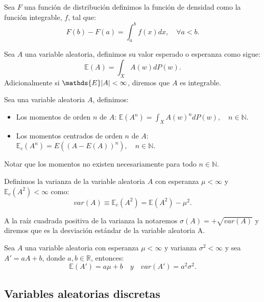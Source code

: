 \documentclass[../proyecto.tex]{memoir}
\begin{document}
\begin{defi}
Sea $F$ una función de distribución definimos la función de densidad como la función integrable, $f$, tal que:
$$
F(b)-F(a) = \int^{b}_a f(x) dx, \quad \forall a < b. 
$$
\end{defi}

\begin{defi}
Sea $A$ una variable aleatoria, definimos su valor esperado o esperanza como sigue:
$$
\mathds{E}(A) = \int_{X}A(w)dP(w).
$$
Adicionalmente si $\mathds{E}\abs{A} < \infty$, diremos que $A$ es integrable.
\end{defi}

\begin{defi}
Sea una variable aleatoria $A$, definimos:
\begin{itemize}
\item Los momentos de orden $n$ de $A$: $\mathds{E}(A^n) = \int_{X}A(w)^{n}dP(w), \quad n \in \mathds{N}$.
\item Los momentos centrados de orden $n$ de $A$: $\mathds{E}_c(A^n) = E( (A-E(A))^n ), \quad n \in \mathds{N}$.
\end{itemize}
\end{defi}

Notar que los momentos no existen necesariamente para todo $n\in \mathds{N}$.

\begin{defi}
Definimos la varianza de la variable aleatoria $A$ con esperanza $\mu < \infty$ y $\mathds{E}_c(A^2) < \infty $ como:$$
var(A) \equiv \mathds{E}_c(A^2) = \mathds{E}(A^2) - \mu^2.
$$
\end{defi}

\begin{defi}
A la raíz cuadrada positiva de la varianza la notaremos $\sigma(A)=+\sqrt{var(A)}$ y diremos que es la desviación estándar de la variable aleatoria A. 
\end{defi}

\begin{prop}
Sea $A$ una variable aleatoria con esperanza $\mu < \infty$ y varianza $\sigma^2 < \infty$ y sea $A'=aA+b$, donde $a,b\in\mathds{R}$, entonces: $$
\mathds{E}(A')=a\mu + b \quad y \quad var(A') = a^2 \sigma^2.
$$

\end{prop}


\subsection{Variables aleatorias discretas}
\end{document}
